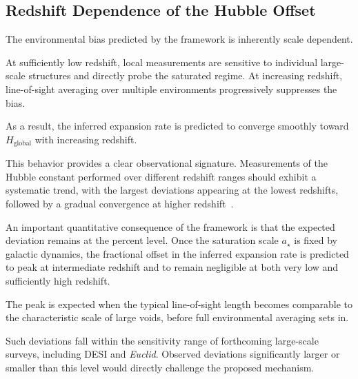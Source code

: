 \subsection{Redshift Dependence of the Hubble Offset}
  \label{subsec:redshift_dependence}

  The environmental bias predicted by the framework is inherently scale dependent.

  At sufficiently low redshift, local measurements are sensitive to individual
  large-scale structures and directly probe the saturated regime.
  At increasing redshift, line-of-sight averaging over multiple environments
  progressively suppresses the bias.

  As a result, the inferred expansion rate is predicted to converge smoothly
  toward $H_{\mathrm{global}}$ with increasing redshift.

  This behavior provides a clear observational signature.
  Measurements of the Hubble constant performed over different redshift ranges
  should exhibit a systematic trend, with the largest deviations appearing at the
  lowest redshifts, followed by a gradual convergence at higher
  redshift~\cite{Verde2019Review}.

  An important quantitative consequence of the framework is that the expected
  deviation remains at the percent level.
  Once the saturation scale $a_\star$ is fixed by galactic dynamics, the fractional
  offset in the inferred expansion rate is predicted to peak at intermediate
  redshift and to remain negligible at both very low and sufficiently high redshift.

  The peak is expected when the typical line-of-sight length becomes comparable
  to the characteristic scale of large voids, before full environmental averaging
  sets in.

  Such deviations fall within the sensitivity range of forthcoming large-scale
  surveys, including DESI and \textit{Euclid}.
  Observed deviations significantly larger or smaller than this level would
  directly challenge the proposed mechanism.
